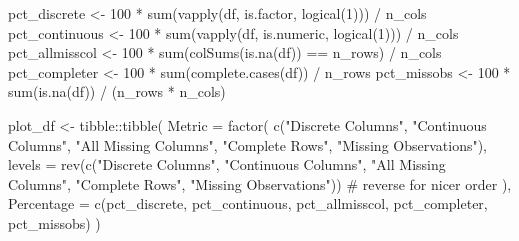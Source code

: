 \documentclass[
  letterpaper,
  DIV=11,
  numbers=noendperiod]{scrartcl}
\newenvironment{Shaded}{\begin{snugshade}}{\end{snugshade}}
\newcommand{\AttributeTok}[1]{\textcolor[rgb]{0.40,0.45,0.13}{#1}}
\newcommand{\CommentTok}[1]{\textcolor[rgb]{0.37,0.37,0.37}{#1}}
\newcommand{\DecValTok}[1]{\textcolor[rgb]{0.68,0.00,0.00}{#1}}
\newcommand{\FunctionTok}[1]{\textcolor[rgb]{0.28,0.35,0.67}{#1}}
\newcommand{\NormalTok}[1]{\textcolor[rgb]{0.00,0.23,0.31}{#1}}
\newcommand{\OtherTok}[1]{\textcolor[rgb]{0.00,0.23,0.31}{#1}}
\newcommand{\SpecialCharTok}[1]{\textcolor[rgb]{0.37,0.37,0.37}{#1}}
\newcommand{\StringTok}[1]{\textcolor[rgb]{0.13,0.47,0.30}{#1}}
\begin{document}
\begin{Shaded}
\begin{Highlighting}[]
\NormalTok{  pct\_discrete   }\OtherTok{\textless{}{-}} \DecValTok{100} \SpecialCharTok{*} \FunctionTok{sum}\NormalTok{(}\FunctionTok{vapply}\NormalTok{(df, is.factor,  }\FunctionTok{logical}\NormalTok{(}\DecValTok{1}\NormalTok{))) }\SpecialCharTok{/}\NormalTok{ n\_cols}
\NormalTok{  pct\_continuous }\OtherTok{\textless{}{-}} \DecValTok{100} \SpecialCharTok{*} \FunctionTok{sum}\NormalTok{(}\FunctionTok{vapply}\NormalTok{(df, is.numeric, }\FunctionTok{logical}\NormalTok{(}\DecValTok{1}\NormalTok{))) }\SpecialCharTok{/}\NormalTok{ n\_cols}
\NormalTok{  pct\_allmisscol }\OtherTok{\textless{}{-}} \DecValTok{100} \SpecialCharTok{*} \FunctionTok{sum}\NormalTok{(}\FunctionTok{colSums}\NormalTok{(}\FunctionTok{is.na}\NormalTok{(df)) }\SpecialCharTok{==}\NormalTok{ n\_rows) }\SpecialCharTok{/}\NormalTok{ n\_cols}
\NormalTok{  pct\_completer  }\OtherTok{\textless{}{-}} \DecValTok{100} \SpecialCharTok{*} \FunctionTok{sum}\NormalTok{(}\FunctionTok{complete.cases}\NormalTok{(df)) }\SpecialCharTok{/}\NormalTok{ n\_rows}
\NormalTok{  pct\_missobs    }\OtherTok{\textless{}{-}} \DecValTok{100} \SpecialCharTok{*} \FunctionTok{sum}\NormalTok{(}\FunctionTok{is.na}\NormalTok{(df)) }\SpecialCharTok{/}\NormalTok{ (n\_rows }\SpecialCharTok{*}\NormalTok{ n\_cols)}

\NormalTok{  plot\_df }\OtherTok{\textless{}{-}}\NormalTok{ tibble}\SpecialCharTok{::}\FunctionTok{tibble}\NormalTok{(}
    \AttributeTok{Metric =} \FunctionTok{factor}\NormalTok{(}
      \FunctionTok{c}\NormalTok{(}\StringTok{"Discrete Columns"}\NormalTok{, }\StringTok{"Continuous Columns"}\NormalTok{, }\StringTok{"All Missing Columns"}\NormalTok{,}
        \StringTok{"Complete Rows"}\NormalTok{, }\StringTok{"Missing Observations"}\NormalTok{),}
      \AttributeTok{levels =} \FunctionTok{rev}\NormalTok{(}\FunctionTok{c}\NormalTok{(}\StringTok{"Discrete Columns"}\NormalTok{, }\StringTok{"Continuous Columns"}\NormalTok{, }\StringTok{"All Missing Columns"}\NormalTok{,}
                     \StringTok{"Complete Rows"}\NormalTok{, }\StringTok{"Missing Observations"}\NormalTok{)) }\CommentTok{\# reverse for nicer order}
\NormalTok{    ),}
    \AttributeTok{Percentage =} \FunctionTok{c}\NormalTok{(pct\_discrete, pct\_continuous, pct\_allmisscol, pct\_completer, pct\_missobs)}
\NormalTok{  )}


\end{Highlighting}
\end{Shaded}
\end{document}
